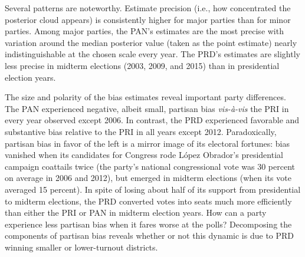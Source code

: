 \documentclass[letter,12pt]{article}
\begin{document}
{Several patterns are noteworthy. Estimate precision (i.e., how concentrated the posterior cloud appears) is consistently higher for major parties than for minor parties. Among major parties, the PAN's estimates are the most precise with variation around the median posterior value (taken as the point estimate) nearly indistinguishable at the chosen scale every year. The PRD's estimates are slightly less precise in midterm elections (2003, 2009, and 2015) than in presidential election years.  

The size and polarity of the bias estimates reveal important party differences. The PAN experienced negative, albeit small, partisan bias \emph{vis-\`a-vis} the PRI in every year observed except 2006. In contrast, the PRD experienced favorable and substantive bias relative to the PRI in all years except 2012. Paradoxically, partisan bias in favor of the left is a mirror image of its electoral fortunes: bias vanished when its candidates for Congress rode L\'opez Obrador's presidential campaign coattails twice (the party's national congressional vote was 30 percent on average in 2006 and 2012), but emerged in midterm elections (when its vote averaged 15 percent). In spite of losing about half of its support from presidential to midterm elections, the PRD converted votes into seats much more efficiently than either the PRI or PAN in midterm election years. How can a party experience less partisan bias when it fares worse at the polls? Decomposing the components of partisan bias reveals whether or not this dynamic is due to PRD winning smaller or lower-turnout districts.


}
\end{document}
